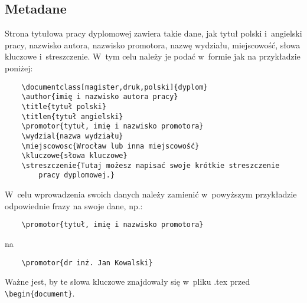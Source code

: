 \documentclass[12pt,a4paper]{article}
\begin{document}
\subsection{Metadane}
Strona tytułowa pracy dyplomowej zawiera takie dane, jak tytuł polski i~angielski pracy, nazwisko autora, nazwisko promotora, nazwę wydziału, miejscowość, słowa kluczowe i~streszczenie. W~tym celu należy je podać w~formie jak na przykładzie poniżej:
\begin{verbatim}
    \documentclass[magister,druk,polski]{dyplom}
    \author{imię i nazwisko autora pracy}
    \title{tytuł polski}
    \titlen{tytuł angielski}
    \promotor{tytuł, imię i nazwisko promotora}
    \wydzial{nazwa wydziału}
    \miejscowosc{Wrocław lub inna miejscowość}
    \kluczowe{słowa kluczowe}
    \streszczenie{Tutaj możesz napisać swoje krótkie streszczenie 
        pracy dyplomowej.}
\end{verbatim}
W~celu wprowadzenia swoich danych należy zamienić w~powyższym przykładzie odpowiednie frazy na swoje dane, np.:
\begin{verbatim}
    \promotor{tytuł, imię i nazwisko promotora}
\end{verbatim}
na
\begin{verbatim}
    \promotor{dr inż. Jan Kowalski}
\end{verbatim}
Ważne jest, by te słowa kluczowe znajdowały się w~pliku .tex przed 
\verb|\begin{document}|.
\end{document}

